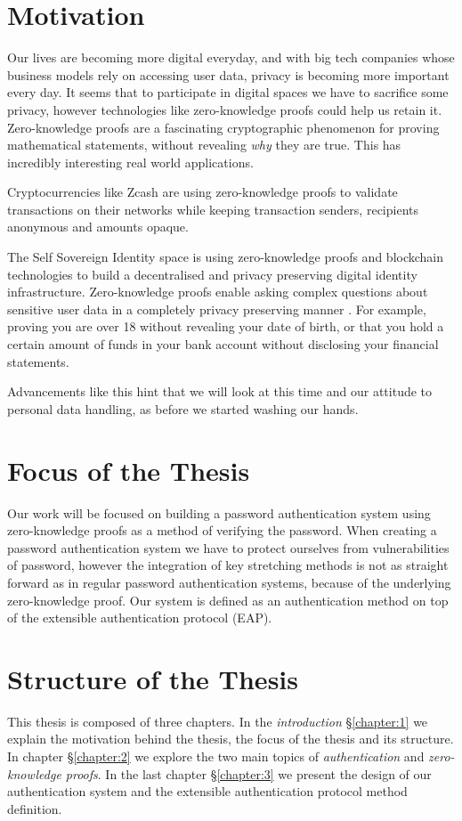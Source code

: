\label{chapter:1}

\section{Motivation}
Our lives are becoming more digital everyday, and with big tech companies whose business models rely on accessing user data, privacy is becoming more important every day.
It seems that to participate in digital spaces we have to sacrifice some privacy, however technologies like zero-knowledge proofs could help us retain it.
Zero-knowledge proofs are a fascinating cryptographic phenomenon for proving mathematical statements, without revealing \textit{why} they are true. 
This has incredibly interesting real world applications.

Cryptocurrencies like Zcash \cite{hopwood2016zcash} are using zero-knowledge proofs to validate transactions on their networks while keeping transaction senders, recipients anonymous and amounts opaque.

The Self Sovereign Identity space is using zero-knowledge proofs and blockchain technologies to build a decentralised and privacy preserving digital identity infrastructure.
Zero-knowledge proofs enable asking complex questions about sensitive user data in a completely privacy preserving manner \cite{10.1007/978-3-540-89255-7_15}.
For example, proving you are over 18 without revealing your date of birth, or that you hold a certain amount of funds in your bank account without disclosing your financial statements.

Advancements like this hint that we will look at this time and our attitude to personal data handling, as before we started washing our hands.
\bigskip

\section{Focus of the Thesis}
Our work will be focused on building a password authentication system using zero-knowledge proofs as a method of verifying the password.
When creating a password authentication system we have to protect ourselves from vulnerabilities of password, however the integration of key stretching methods is not as straight forward as in regular password authentication systems, because of the underlying zero-knowledge proof.
Our system is defined as an authentication method on top of the extensible authentication protocol (EAP).

\section{Structure of the Thesis}
This thesis is composed of three chapters.
In the \textit{introduction} \S\ref{chapter:1} we explain the motivation behind the thesis, the focus of the thesis and its structure.
In chapter \S\ref{chapter:2} we explore the two main topics of \textit{authentication} and \textit{zero-knowledge proofs}.
In the last chapter \S\ref{chapter:3} we present the design of our authentication system and the extensible authentication protocol method definition.

